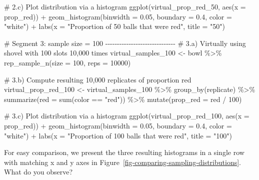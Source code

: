 \documentclass[
  letterpaper,
  DIV=11,
  numbers=noendperiod]{scrreprt}
\newenvironment{Shaded}{\begin{snugshade}}{\end{snugshade}}
\newcommand{\AttributeTok}[1]{\textcolor[rgb]{0.40,0.45,0.13}{#1}}
\newcommand{\CommentTok}[1]{\textcolor[rgb]{0.37,0.37,0.37}{#1}}
\newcommand{\DecValTok}[1]{\textcolor[rgb]{0.68,0.00,0.00}{#1}}
\newcommand{\FloatTok}[1]{\textcolor[rgb]{0.68,0.00,0.00}{#1}}
\newcommand{\FunctionTok}[1]{\textcolor[rgb]{0.28,0.35,0.67}{#1}}
\newcommand{\NormalTok}[1]{\textcolor[rgb]{0.00,0.23,0.31}{#1}}
\newcommand{\OtherTok}[1]{\textcolor[rgb]{0.00,0.23,0.31}{#1}}
\newcommand{\SpecialCharTok}[1]{\textcolor[rgb]{0.37,0.37,0.37}{#1}}
\newcommand{\StringTok}[1]{\textcolor[rgb]{0.13,0.47,0.30}{#1}}
\theoremstyle{definition}
\theoremstyle{remark}
\begin{document}
\begin{Shaded}
\begin{Highlighting}[]
\CommentTok{\# 2.c) Plot distribution via a histogram}
\FunctionTok{ggplot}\NormalTok{(virtual\_prop\_red\_50, }\FunctionTok{aes}\NormalTok{(}\AttributeTok{x =}\NormalTok{ prop\_red)) }\SpecialCharTok{+}
  \FunctionTok{geom\_histogram}\NormalTok{(}\AttributeTok{binwidth =} \FloatTok{0.05}\NormalTok{, }\AttributeTok{boundary =} \FloatTok{0.4}\NormalTok{, }\AttributeTok{color =} \StringTok{"white"}\NormalTok{) }\SpecialCharTok{+}
  \FunctionTok{labs}\NormalTok{(}\AttributeTok{x =} \StringTok{"Proportion of 50 balls that were red"}\NormalTok{, }\AttributeTok{title =} \StringTok{"50"}\NormalTok{)  }

\CommentTok{\# Segment 3: sample size = 100 {-}{-}{-}{-}{-}{-}{-}{-}{-}{-}{-}{-}{-}{-}{-}{-}{-}{-}{-}{-}{-}{-}{-}{-}{-}{-}{-}{-}{-}{-}}
\CommentTok{\# 3.a) Virtually using shovel with 100 slots 10,000 times}
\NormalTok{virtual\_samples\_100 }\OtherTok{\textless{}{-}}\NormalTok{ bowl }\SpecialCharTok{\%\textgreater{}\%} 
  \FunctionTok{rep\_sample\_n}\NormalTok{(}\AttributeTok{size =} \DecValTok{100}\NormalTok{, }\AttributeTok{reps =} \DecValTok{10000}\NormalTok{)}

\CommentTok{\# 3.b) Compute resulting 10,000 replicates of proportion red}
\NormalTok{virtual\_prop\_red\_100 }\OtherTok{\textless{}{-}}\NormalTok{ virtual\_samples\_100 }\SpecialCharTok{\%\textgreater{}\%} 
  \FunctionTok{group\_by}\NormalTok{(replicate) }\SpecialCharTok{\%\textgreater{}\%} 
  \FunctionTok{summarize}\NormalTok{(}\AttributeTok{red =} \FunctionTok{sum}\NormalTok{(color }\SpecialCharTok{==} \StringTok{"red"}\NormalTok{)) }\SpecialCharTok{\%\textgreater{}\%} 
  \FunctionTok{mutate}\NormalTok{(}\AttributeTok{prop\_red =}\NormalTok{ red }\SpecialCharTok{/} \DecValTok{100}\NormalTok{)}

\CommentTok{\# 3.c) Plot distribution via a histogram}
\FunctionTok{ggplot}\NormalTok{(virtual\_prop\_red\_100, }\FunctionTok{aes}\NormalTok{(}\AttributeTok{x =}\NormalTok{ prop\_red)) }\SpecialCharTok{+}
  \FunctionTok{geom\_histogram}\NormalTok{(}\AttributeTok{binwidth =} \FloatTok{0.05}\NormalTok{, }\AttributeTok{boundary =} \FloatTok{0.4}\NormalTok{, }\AttributeTok{color =} \StringTok{"white"}\NormalTok{) }\SpecialCharTok{+}
  \FunctionTok{labs}\NormalTok{(}\AttributeTok{x =} \StringTok{"Proportion of 100 balls that were red"}\NormalTok{, }\AttributeTok{title =} \StringTok{"100"}\NormalTok{) }
\end{Highlighting}
\end{Shaded}

For easy comparison, we present the three resulting histograms in a
single row with matching x and y axes in
Figure~\ref{fig-comparing-sampling-distributions}. What do you observe?
\end{document}
